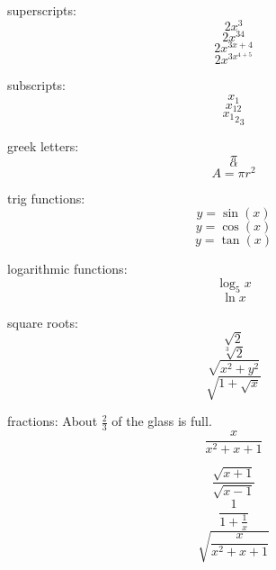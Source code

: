\documentclass[11pt]{article}
\begin{document}
superscripts: $$2x^3$$
$$2x^{34}$$
$$2x^{3x+4}$$
$$2x^{3x^{4+5}}$$

subscripts: 
$$x_1$$
$$x_{12}$$
$${{x_1}_2}_3$$

greek letters:
$$\pi$$
$$\alpha$$
$$A=\pi r^2$$

trig functions:
$$y=\sin(x)$$
$$y=\cos(x)$$
$$y=\tan(x)$$

logarithmic functions:
$$\log_5{x}$$
$$\ln{x}$$

square roots:
$$\sqrt{2}$$
$$\sqrt[3]{2}$$
$$\sqrt{x^2+y^2}$$
$$\sqrt{1+\sqrt{x}}$$

fractions:
\linebreak
\linebreak
About $\displaystyle{\frac{2}{3}}$ of the glass is full.
$$\frac{x}{x^2+x+1}$$

$$\frac{\sqrt{x+1}}{\sqrt{x-1}}$$
$$\frac{1}{1+\frac{1}{x}}$$
$$\sqrt{\frac{x}{x^2+x+1}}$$
\end{document}

